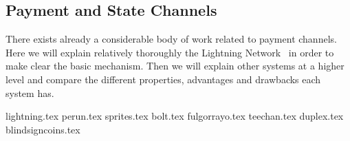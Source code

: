 \subsection{Payment and State Channels}
\label{sec:literaturereview:channels}
  There exists already a considerable body of work related to payment channels. Here we
  will explain relatively thoroughly the Lightning Network~\cite{lightning} in order to
  make clear the basic mechanism. Then we will explain other systems at a higher level and
  compare the different properties, advantages and drawbacks each system has.

  {lightning.tex}
  {perun.tex}
  {sprites.tex}
  {bolt.tex}
  {fulgorrayo.tex}
  {teechan.tex}
  {duplex.tex}
  {blindsigncoins.tex}
